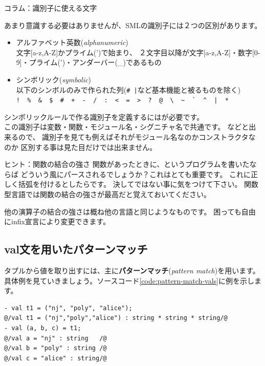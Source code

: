 \documentclass[11pt,a4paper]{article}
\begin{document}
\begin{itembox}[l]{コラム：識別子に使える文字}

あまり意識する必要はありませんが、SMLの識別子には２つの区別があります。

\begin{itemize}
\item アルファベット英数(\textit{alphanumeric}) \\
  文字[a-z,A-Z]かプライム(')で始まり、
  ２文字目以降が文字[a-z,A-Z]・数字[0-9]・プライム(')・アンダーバー(\_)であるもの
\item シンボリック(\textit{symbolic})\\
  以下のシンボルのみで作られた列(\verb(# |(など基本機能と被るものを除く)\\
\Verb(!  %  &  $  #  +  -  /  :  <  =  >  ?  @  \  ~  `  ^  |  *(
\end{itemize}
シンボリックルールで作る識別子を定義するにはが必要です。\\
この識別子は変数・関数・モジュール名・シグニチャ名で共通です。
などと出来るので、
識別子を見ても例えばそれがモジュール名なのかコンストラクタなのか
区別する事は見た目だけでは出来ません。
\end{itembox}

\begin{itembox}[l]{ヒント：関数の結合の強さ}
関数があったときに、というプログラムを書いたならば
どういう風にパースされるでしょうか？これはとても重要です。
これに正しく括弧を付けるとしたらです。
決してではない事に気をつけて下さい。
関数型言語では関数の結合の強さが最高だと覚えておいてください。

他の演算子の結合の強さは概ね他の言語と同じようなものです。
困っても自由にinfix宣言により変更できます。
\end{itembox}

\subsection{val文を用いたパターンマッチ}

タプルから値を取り出すには、主に{\bfseries パターンマッチ}({\itshape pattern match})を用います。
具体例を見ていきましょう。ソースコード\ref{code:pattern-match-vals}に例を示します。

\begin{lstlisting}[caption=val文でパターンマッチ,label=code:pattern-match-vals]
- val t1 = ("nj", "poly", "alice");
@/val t1 = ("nj","poly","alice") : string * string * string/@
- val (a, b, c) = t1;
@/val a = "nj" : string   /@
@/val b = "poly" : string /@
@/val c = "alice" : string/@
\end{lstlisting}
\end{document}
